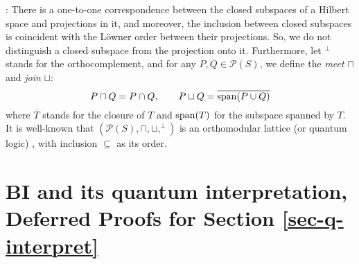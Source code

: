 \documentclass[conference,compsoc, 10pt]{IEEEtran}
\newcommand {\cP } {{\mathcal{P}}}
\newcommand {\spa } {{\rm span}}
\newcommand{\qvee}{\sqcup}
\newcommand{\qwedge}{\sqcap}
\begin{document}
\begin{appendices}
		
		\vspace{0.3cm}
		
		: There is a one-to-one correspondence between the closed subspaces of a Hilbert space and projections in it, and moreover, the inclusion between closed subspaces is coincident with the L\"owner order between their projections.
		So, we do not distinguish a closed subspace from the projection onto it. Furthermore, let $^\perp$ stands for the orthocomplement, and for any $P, Q\in\cP(S)$, we define the \emph{meet} $\qwedge$ and \emph{join} $\qvee$: $$P\qwedge Q=P\cap Q,\quad\quad P\qvee Q=\overline{\operatorname{\spa}(P\cup Q)}$$ where $\overline{T}$ stands for the closure of $T$ and $\operatorname{\spa}(T)$ for the subspace spanned by $T$.
		It is well-known that $(\cP(S),\qwedge,\qvee,^\perp)$ is an orthomodular lattice (or quantum logic) \cite{BvN36, KA83}, with inclusion $\subseteq$ as its order.
		
		\section{BI and its quantum interpretation, Deferred Proofs for Section \ref{sec-q-interpret}}
		\label{sec app BI}
		

\end{appendices}
\end{document}
